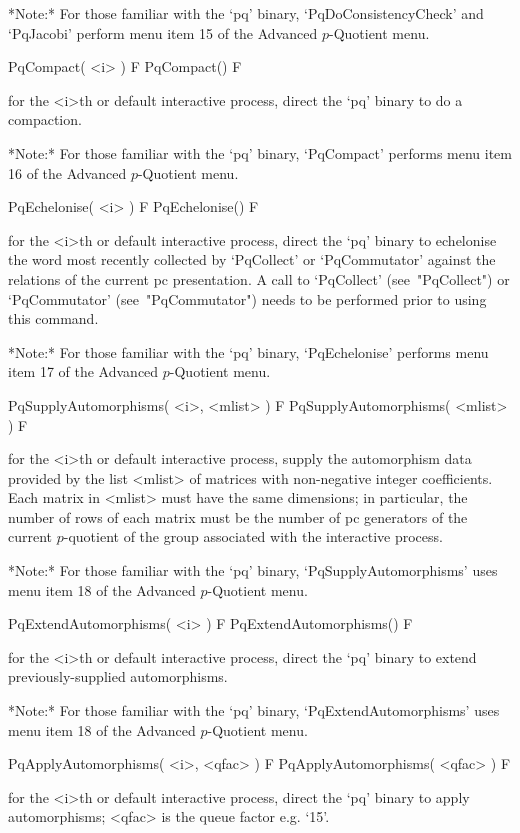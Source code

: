 *Note:*
For those familiar  with  the  `pq'  binary,  `PqDoConsistencyCheck'  and
`PqJacobi' perform menu item 15 of the Advanced $p$-Quotient menu.

\>PqCompact( <i> ) F
\>PqCompact() F

for the <i>th or default interactive {\ANUPQ} process,  direct  the  `pq'
binary to do a compaction.

*Note:*
For those familiar with the `pq' binary, `PqCompact' performs  menu  item
16 of the Advanced $p$-Quotient menu.

\>PqEchelonise( <i> ) F
\>PqEchelonise() F

for the <i>th or default interactive {\ANUPQ} process,  direct  the  `pq'
binary to echelonise the word most recently collected by  `PqCollect'  or
`PqCommutator' against the relations of the current  pc  presentation.  A
call    to    `PqCollect'     (see~"PqCollect")     or     `PqCommutator'
(see~"PqCommutator") needs to be performed prior to using this command.

*Note:*
For those familiar with the `pq'  binary,  `PqEchelonise'  performs  menu
item 17 of the Advanced $p$-Quotient menu.

\>PqSupplyAutomorphisms( <i>, <mlist> ) F
\>PqSupplyAutomorphisms( <mlist> ) F

for the  <i>th  or  default  interactive  {\ANUPQ}  process,  supply  the
automorphism  data  provided  by  the  list  <mlist>  of  matrices   with
non-negative integer coefficients. Each matrix in <mlist> must  have  the
same dimensions; in particular, the number of rows of each matrix must be
the number of pc generators of the  current  $p$-quotient  of  the  group
associated with the interactive {\ANUPQ} process.

*Note:* 
For those familiar with the  `pq'  binary,  `PqSupplyAutomorphisms'  uses
menu item 18 of the Advanced $p$-Quotient menu.

\>PqExtendAutomorphisms( <i> ) F
\>PqExtendAutomorphisms() F

for the <i>th or default interactive {\ANUPQ} process,  direct  the  `pq'
binary to extend previously-supplied automorphisms.

*Note:*
For those familiar with the  `pq'  binary,  `PqExtendAutomorphisms'  uses
menu item 18 of the Advanced $p$-Quotient menu.

\>PqApplyAutomorphisms( <i>, <qfac> ) F
\>PqApplyAutomorphisms( <qfac> ) F

for the <i>th or default interactive {\ANUPQ} process,  direct  the  `pq'
binary to apply automorphisms; <qfac> is the queue factor e.g. `15'.

